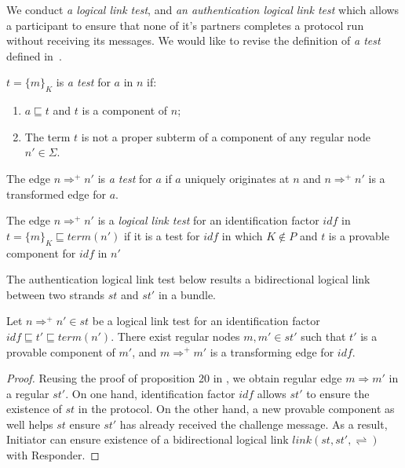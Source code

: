 We conduct \emph{a logical link test}, and \emph{an authentication logical link test} which allows a participant to ensure that none of it's partners completes a protocol run without receiving its messages. We would like to revise the definition of \emph{a test} defined in~\cite{authenticationtests}. 

\begin{Definition}[A Test] 
$t = \{m\}_K$ is \emph{a test} for $a$ in $n$ if:
\begin{enumerate}
\item $a\sqsubseteq t$ and $t$ is a component of $n$;
\item The term $t$ is not a proper subterm of a component of any regular node $n' \in \Sigma$. 
\end{enumerate}
The edge $n \Rightarrow^+ n'$ is \emph{a test} for $a$ if $a$ uniquely originates at $n$ and $n \Rightarrow^+ n'$ is a transformed edge for $a$. 
\end{Definition}

\begin{Definition} The edge $n \Rightarrow^+ n'$ is a \emph{logical link test} for an identification factor $idf$ in $t = \{m\}_K \sqsubseteq term(n')$ if it is a test for $idf$ in which $K \not\in P$ and $t$ is a provable component for $idf$ in $n'$
\end{Definition}

The authentication logical link test below results a bidirectional logical link between two strands $st$ and $st'$ in a bundle. 
\begin{Proposition}\label{logicaltest}Let $n \Rightarrow^+ n' \in st$ be a logical link test for an identification factor $idf \sqsubseteq t' \sqsubseteq term(n')$. There exist regular nodes $m, m' \in st'$ such that $t'$ is a provable component of $m'$, and $m \Rightarrow^+ m'$ is a transforming edge for $idf$. 
\end{Proposition}

\begin{proof}
Reusing the proof of proposition 20 in \cite{Guttman:2002:ATS:568264.568267}, we obtain regular edge $m \Rightarrow m'$ in a regular $st'$. On one hand, identification factor $idf$ allows $st'$ to ensure the existence of $st$ in the protocol. On the other hand, a new provable component as well helps $st$ ensure $st'$ has already received the challenge message. As a result, Initiator can ensure existence of a bidirectional logical link $link(st,st',\rightleftharpoons)$ with Responder. 
\end{proof}

